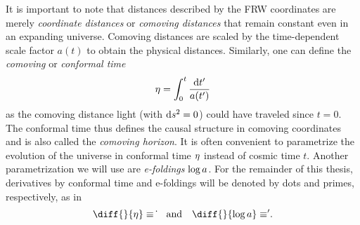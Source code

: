 \documentclass[12pt,parskip=half]{scrreprt}
\begin{document}
It is important to note that distances described by the FRW coordinates are merely \emph{coordinate distances} or \emph{comoving distances} that remain constant even in an expanding universe. Comoving distances are scaled by the time-dependent scale factor \(a(t)\) to obtain the physical distances. Similarly, one can define the \emph{comoving} or \emph{conformal time}
\begin{equation}
	\conft = \int_0^t \frac{\dif{t^\prime}}{a(t^\prime)}
\end{equation}
as the comoving distance light (with \(\dif{s}^2=0\)) could have traveled since \(t=0\). The conformal time thus defines the causal structure in comoving coordinates and is also called the \emph{comoving horizon}. It is often convenient to parametrize the evolution of the universe in conformal time \(\eta\) instead of cosmic time \(t\). Another parametrization we will use are \emph{e-foldings} \(\log a\). For the remainder of this thesis, derivatives by conformal time and e-foldings will be denoted by dots and primes, respectively, as in
\begin{equation}
	\diff{}{\conft}\equiv\dconf{} \quad \text{and} \quad \diff{}{\efold}\equiv\defold{}
	\eqpunct{.}
\end{equation}
\end{document}
